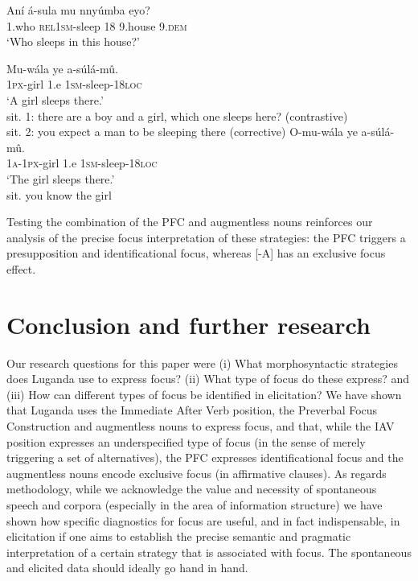 \documentclass[output=paper]{langsci/langscibook}
\begin{document}
\ea\label{ex:vanderwal:42}
\ea\label{ex:vanderwal:42a}
\gll   Aní  á-sula      mu  nnyúmba  eyo?\\
       1.who  \textsc{rel1sm}-sleep  18  9.house  9.\textsc{dem}\\
\glt   ‘Who sleeps in this house?’


\ex\label{ex:vanderwal:42b}
\gll     Mu-wála  ye  a-súlá-mû.\\
         \textsc{1px}-girl  1.e  \textsc{1sm}-sleep-\textsc{18loc}\\
\glt ‘A girl sleeps there.’\\
sit. 1: there are a boy and a girl, which one sleeps here? (contrastive)\\
sit. 2: you expect a man to be sleeping there (corrective)
\ex\label{ex:vanderwal:42c}
\gll    O-mu-wála  ye  a-súlá-mû.\\
         \textsc{1a}-\textsc{1px}-girl  1.e  \textsc{1sm}-sleep-\textsc{18loc}\\
\glt ‘The girl sleeps there.’\\
sit. you know the girl
\z
\z

Testing the combination of the PFC and augmentless nouns reinforces our analysis of the precise focus interpretation of these strategies: the PFC triggers a presupposition and identificational focus, whereas [-A] has an exclusive focus effect.

\section{Conclusion and further research}\label{sec:vanderwal:6}

Our research questions for this paper were 
(i) What morphosyntactic strategies does Luganda use to express focus? 
(ii) What type of focus do these express? 
and (iii) How can different types of focus be identified in elicitation? We have shown that Luganda uses the Immediate After Verb position, the Preverbal Focus Construction and augmentless nouns to express focus, and that, while the IAV position expresses an underspecified type of focus (in the sense of merely triggering a set of alternatives), the PFC expresses identificational focus and the augmentless nouns encode exclusive focus (in affirmative clauses). As regards methodology, while we acknowledge the value and necessity of spontaneous speech and corpora (especially in the area of information structure) we have shown how specific diagnostics for focus are useful, and in fact indispensable, in elicitation if one aims to establish the precise semantic and pragmatic interpretation of a certain strategy that is associated with focus. The spontaneous and elicited data should ideally go hand in hand.
\end{document}
